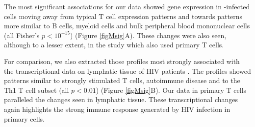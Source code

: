 \documentclass[../sherrill-Mix_thesis.tex]{subfiles}
\begin{document}
		The most significant associations for our data showed gene expression in \hivEight{}-infected cells moving away from typical T cell expression patterns and towards patterns more similar to B cells, myeloid cells and bulk peripheral blood mononuclear cells (all Fisher's $p<10^{-15}$) (Figure \ref{figMsig}A). These changes were also seen, although to a lesser extent, in the \citet{Imbeault2009} study which also used primary \cdFour{} T cells.

		For comparison, we also extracted those profiles most strongly associated with the transcriptional data on lymphatic tissue of HIV patients \citep{Li2009}. The profiles showed patterns similar to strongly stimulated T cells, autoimmune disease and to the Th1 T cell subset (all $p<0.01$) (Figure \ref{figMsig}B). Our data in primary \cdFour{} T cells paralleled the changes seen in lymphatic tissue. These transcriptional changes again highlights the strong immune response generated by HIV infection in primary cells.
		
\end{document}
